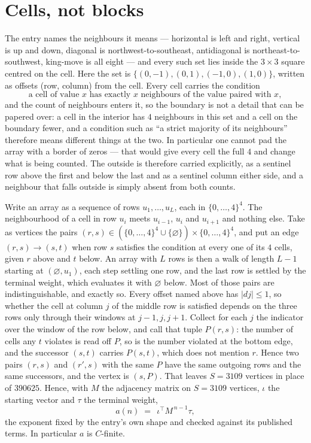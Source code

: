 \documentclass[11pt,a4paper]{article}
\theoremstyle{plain}
\theoremstyle{definition}
\begin{document}
\section{Cells, not blocks}

The entry names the neighbours it means --- horizontal is left and right, vertical is up and
down, diagonal is northwest-to-southeast, antidiagonal is northeast-to-southwest, king-move is
all eight --- and every such set lies inside the $3\times3$ square centred on the cell. Here
the set is $\{(0,-1), (0,1), (-1,0), (1,0)\}$, written as offsets (row, column) from the cell. Every cell carries
the condition
\[
\text{a cell of value }x\text{ has exactly }x\text{ neighbours of the value paired with }x,
\]
and the count of neighbours enters it, so the boundary is not a detail that can be papered
over: a cell in the interior has $4$ neighbours in this set and a cell on the boundary
fewer, and a condition such as ``a strict majority of its neighbours'' therefore means
different things at the two. In particular one cannot pad the array with a border of zeros ---
that would give every cell the full $4$ and change what is being counted. The outside is
therefore carried
explicitly, as a sentinel row above the first and below the last and as a sentinel column
either side, and a neighbour that falls outside is simply absent from both counts.

Write an array as a sequence of rows $u_1,\dots,u_L$, each in
$\{0,\dots,4\}^{4}$. The neighbourhood of a cell in row $u_i$ meets $u_{i-1}$,
$u_i$ and $u_{i+1}$ and nothing else. Take as vertices the pairs
$(r,s)\in(\{0,\dots,4\}^{4}\cup\{\varnothing\})\times\{0,\dots,4\}^{4}$,
and put an edge $(r,s)\to(s,t)$ when row $s$ satisfies the condition at every one of its
$4$ cells, given $r$ above and $t$ below. An array with $L$ rows is then a walk of length
$L-1$ starting at $(\varnothing,u_1)$, each step settling one row, and the last row is
settled by the terminal weight, which evaluates it with $\varnothing$ below. Most of those pairs are indistinguishable, and exactly so. Every offset named above has $|dj|\le 1$, so whether the cell at column $j$ of the middle row is satisfied depends on the three rows only through their windows at $j-1,j,j+1$. Collect for each $j$ the indicator over the window of the row below, and call that tuple $P(r,s)$: the number of cells any $t$ violates is read off $P$, so is the number violated at the bottom edge, and the successor $(s,t)$ carries $P(s,t)$, which does not mention $r$. Hence two pairs $(r,s)$ and $(r',s)$ with the same $P$ have the same outgoing rows and the same successors, and the vertex is $(s,P)$. That leaves $S=3109$ vertices in place of $390625$. Hence,
with $M$ the adjacency matrix on $S=3109$ vertices, $\iota$ the starting vector and $\tau$ the
terminal weight,
\[
a(n)\;=\;\,\iota^{\!\top}M^{\,n-1}\tau ,
\]
the exponent fixed by the entry's own shape and checked against its published terms. In
particular $a$ is $C$-finite.
\end{document}
